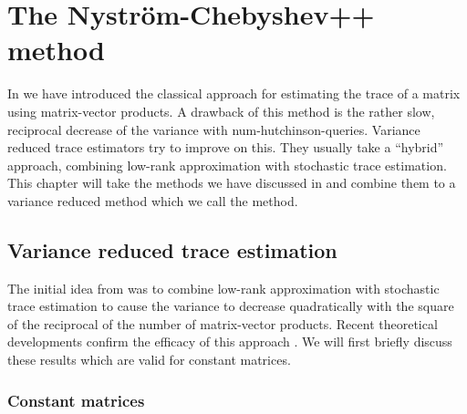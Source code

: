 \chapter{The Nystr\"om-Chebyshev++ method}
\label{chp:4-nystromchebyshev}

In  we have introduced the
classical approach for estimating the trace of a matrix using matrix-vector
products. A drawback of this method is the rather slow, reciprocal decrease of
the variance with \gls{num-hutchinson-queries}. Variance reduced trace estimators
try to improve on this. They usually take a \enquote{hybrid} approach, combining
low-rank approximation with stochastic trace estimation.\\

This chapter will take the methods we have discussed in 
and  combine them to a variance reduced method which
we call the  method.


\section{Variance reduced trace estimation}
\label{sec:4-nystromchebyshev-hybrid}

The initial idea from \cite{lin2017randomized} was to combine low-rank approximation
with stochastic trace estimation to cause the variance to decrease quadratically
with the square of the reciprocal of the number of matrix-vector products.
Recent theoretical developments confirm the
efficacy of this approach \cite{meyer2021hutch,persson2022hutch}.
We will first briefly discuss these results which are valid 
for constant matrices.\\

\subsection{Constant matrices}
\label{subsec:4-nystromchebyshev-reduction-constant-matrices}

